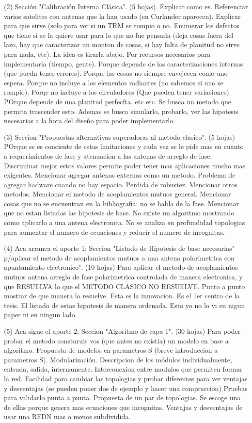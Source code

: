  (2) Sección "Calibración Interna Clásica". (5 hojas).
 Explicar como es. Referenciar varios satelites con antenas que la han usado (en Curlander aparecen).
 Explicar para que sirve (solo para ver si un TRM se rompio o no. Enumerar los defectos que tiene si se la quiere usar para lo que no fue pensada (deja cosas fuera del lazo, hay que caracterizar un monton de cosas, si hay falta de planitud no sirve para nada, etc).
 La idea es tirarla abajo. Por recursos necesarios para implementarla (tiempo, gente). Porque depende de las caracterizaciones internas (que puedn tener errores). Porque las cosas no siempre envejecen como uno espera. Porque no incluye a los elementos radiantes (no sabemos si uno se rompio). Porqe no incluye a los circuladores (Que pueden tener variaciones). POrque depende de una planitud perfecfta. etc etc. Se busca un metodo que permita trascender esto. Ademas se busca simularlo, probarlo, ver las hipotesis necesarias a la hora del diseño para poder implementarlo.
 
 (3) Seccion "Propuestas alternativas superadoras al metodo clasico". (5 hojas)
 POrque se es conciente de estas limitaciones y cada vez se le pide mas en cuanto a requerimientos de fase y atenuacion a las antenas de arreglo de fase. Discriminar mejor estos valores permite poder tener mas aplicaciones mucho mas exigentes.
 Mencionar agregar antenas externas como un metodo. Problema de agregar hadware cuando no hay espacio. Perdida de robustez.
 Mencionar otros metodos. Mencionar el metodo de acoplamientos mutuos general.
 Mencionar cosas que no se encuentran en la bibliografia: no se habla de la fase.
 Mencionar que no estan listadas las hipotesis de base. No existe un algoritmo mostrando como aplicarlo a una antena electronica.  No se analiza en profundidad topologias para aumentar el numero de ecuaciones y reducir el numero de incognitas.
 
 (4) Aca arranca el aporte 1: Seccion "Listado de Hipotesis de base necesarias" p/aplicar el metodo de acoplamientos mutuos a una antena polarimetrica con apuntamiento electronico". (10 hojas)
 Para aplicar el metodo de acoplamientos mutuos antena arreglo de fase polarimetrica controlada de manera electronica, y que RESUELVA lo que el METODO CLASICO NO RESUELVE. Punto a punto mostrar de que manera lo resuelve. Esta es la innovacion. Es el 1er centro de la tesis. El listado de estas hipotesis de manera ordenada. Esto yo no lo vi en nigun paper ni en ningun lado.
 
 (5) Aca sigue el aporte 2: Seccion "Algoritmo de capa 1".  (30 hojas)
 Para poder probar el metodo consturuis vos (que antes no existia) un modelo en base a algoritmo.
 Propuesta de modelos en parametros S (breve introduccion a parametros S). Modularización. Descripcion de los módulos individualmente, entrada, salida, internamente. Interconexion entre modulos que permiten formar la red. Facilidad para cambiar las topologias y probar diferentes para ver ventajas y desventajas (se pueden poner dos de ejemplo y hacer una comprarcion) Pruebas para validarlo punta a punta.
 Propuesta de un par de topologias. Se escoge una de ellas porque genera mas ecuaciones que incognitas. Ventajas y desventajas de usar una RFDN mas o menos subdividida.
 
